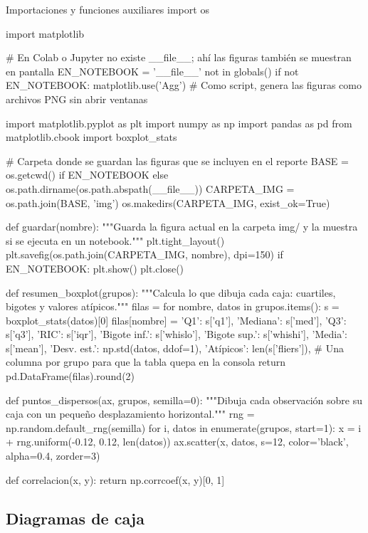\documentclass[11pt,letterpaper]{article}
\begin{document}
\begin{codigo}[label=cod:comun]{Importaciones y funciones auxiliares}
import os

import matplotlib

# En Colab o Jupyter no existe __file__; ahí las figuras también se muestran en pantalla
EN_NOTEBOOK = '__file__' not in globals()
if not EN_NOTEBOOK:
    matplotlib.use('Agg')  # Como script, genera las figuras como archivos PNG sin abrir ventanas

import matplotlib.pyplot as plt
import numpy as np
import pandas as pd
from matplotlib.cbook import boxplot_stats

# Carpeta donde se guardan las figuras que se incluyen en el reporte
BASE = os.getcwd() if EN_NOTEBOOK else os.path.dirname(os.path.abspath(__file__))
CARPETA_IMG = os.path.join(BASE, 'img')
os.makedirs(CARPETA_IMG, exist_ok=True)


def guardar(nombre):
    """Guarda la figura actual en la carpeta img/ y la muestra si se ejecuta en un notebook."""
    plt.tight_layout()
    plt.savefig(os.path.join(CARPETA_IMG, nombre), dpi=150)
    if EN_NOTEBOOK:
        plt.show()
    plt.close()


def resumen_boxplot(grupos):
    """Calcula lo que dibuja cada caja: cuartiles, bigotes y valores atípicos."""
    filas = {}
    for nombre, datos in grupos.items():
        s = boxplot_stats(datos)[0]
        filas[nombre] = {
            'Q1': s['q1'], 'Mediana': s['med'], 'Q3': s['q3'], 'RIC': s['iqr'],
            'Bigote inf.': s['whislo'], 'Bigote sup.': s['whishi'],
            'Media': s['mean'], 'Desv. est.': np.std(datos, ddof=1),
            'Atípicos': len(s['fliers']),
        }
    # Una columna por grupo para que la tabla quepa en la consola
    return pd.DataFrame(filas).round(2)


def puntos_dispersos(ax, grupos, semilla=0):
    """Dibuja cada observación sobre su caja con un pequeño desplazamiento horizontal."""
    rng = np.random.default_rng(semilla)
    for i, datos in enumerate(grupos, start=1):
        x = i + rng.uniform(-0.12, 0.12, len(datos))
        ax.scatter(x, datos, s=12, color='black', alpha=0.4, zorder=3)


def correlacion(x, y):
    return np.corrcoef(x, y)[0, 1]
\end{codigo}

\subsection{Diagramas de caja}
\end{document}
